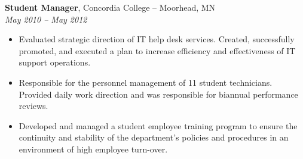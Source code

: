 {\bf Student Manager}, Concordia College -- Moorhead, MN\\
{\it May 2010 – May 2012}
\begin{itemize}
	\item Evaluated strategic direction of IT help desk services.  Created, successfully promoted, and executed a plan to increase efficiency and effectiveness of IT support operations.
	\item Responsible for the personnel management of 11 student technicians.  Provided daily work direction and was responsible for biannual performance reviews.
	\item Developed and managed a student employee training program to ensure the continuity and stability of the department’s policies and procedures in an environment of high employee turn-over.
\end{itemize}